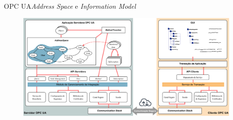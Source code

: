 \documentclass{uspBeamer}
\begin{document}
    \begin{frame}{OPC UA}{\textit{Address Space} e \textit{Information Model}}
        \begin{figure}
            \includegraphics[width=.9\textwidth]{opcuaClientServerArc1.png}
        \end{figure}
    \end{frame}
\end{document}
